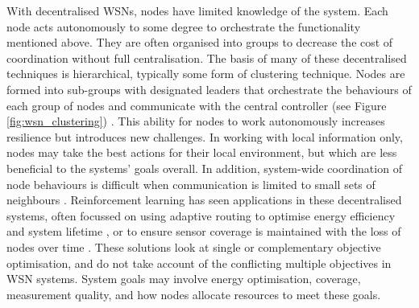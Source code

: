 With decentralised WSNs, nodes have limited knowledge of the system. Each node acts autonomously to some degree to orchestrate the functionality mentioned above. They are often organised into groups to decrease the cost of coordination without full centralisation. The basis of many of these decentralised techniques is hierarchical, typically some form of clustering technique. Nodes are formed into sub-groups with designated leaders that orchestrate the behaviours of each group of nodes and communicate with the central controller (see Figure \ref{fig:wsn_clustering}) . This ability for nodes to work autonomously increases resilience but introduces new challenges. In working with local information only,  nodes may take the best actions for their local environment, but which are less beneficial to the systems' goals overall. In addition, system-wide coordination of node behaviours is difficult when communication is limited to small sets of neighbours \citep{Carlos-Mancilla2016}. Reinforcement learning has seen applications in these decentralised systems, often focussed on using adaptive routing  to optimise energy efficiency and system lifetime \citep{ 10.1504/IJCNDS.2012.048871, Kulkarnib}, or to ensure sensor coverage is maintained with the loss of nodes over time \citep{Sharma2020}. These solutions look at single or complementary objective optimisation, and do not take account of the conflicting multiple objectives in WSN systems. System goals may involve energy optimisation, coverage, measurement quality, and how nodes allocate resources to meet these goals. 


